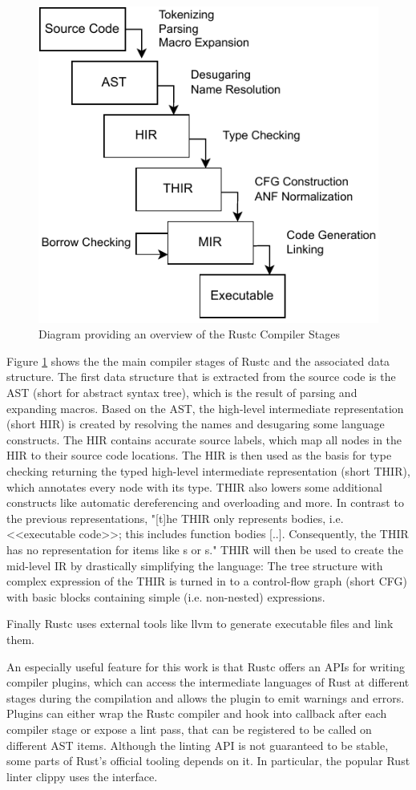 \documentclass[twoside, english]{sdqthesis}
\theoremstyle{definition}
\begin{document}
\begin{figure}[h]
	\centering
	\includegraphics[width=0.6\linewidth]{./rustc-stages.pdf}
	\caption{Diagram providing an overview of the Rustc Compiler Stages}
	\label{fig:rust-stages}
\end{figure}

Figure \ref{fig:rust-stages} shows the the main compiler stages of Rustc and the associated data structure. The first data structure that is extracted from the source code is the AST (short for abstract syntax tree), which is the result of parsing and expanding macros. 
Based on the AST, the high-level intermediate representation (short HIR) is created by resolving the names and desugaring some language constructs. The HIR contains accurate source labels, which map all nodes in the HIR to their source code locations. 
The HIR is then used as the basis for type checking returning the typed high-level intermediate representation (short THIR), which annotates every node with its type. THIR also lowers some additional constructs like automatic dereferencing and overloading and more. In contrast to the previous representations, "[t]he THIR only represents bodies, i.e. <<executable code>>; this includes function bodies [..]. Consequently, the THIR has no representation for items like s or s." \cite[p. 1]{noauthor_thir_nodate}
THIR will then be used to create the mid-level IR by drastically simplifying the language: The tree structure with complex expression of the THIR is turned in to a control-flow graph (short CFG) with basic blocks containing simple (i.e. non-nested) expressions.

Finally Rustc uses external tools \- like llvm \- to generate executable files and link them.

An especially useful feature for this work is that Rustc offers an APIs for writing compiler plugins, which can access the intermediate languages of Rust at different stages during the compilation and allows the plugin to emit warnings and errors. 
Plugins can either wrap the Rustc compiler and hook into callback after each compiler stage or expose a lint pass, that can be registered to be called on different AST items.
Although the linting API is not guaranteed to be stable, some parts of Rust's official tooling depends on it. In particular, the popular Rust linter clippy uses the interface.
\end{document}
